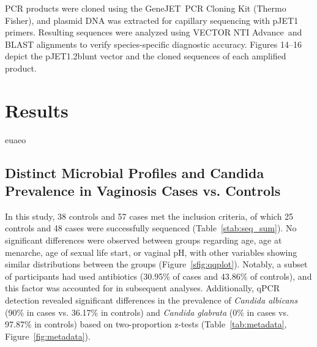 \documentclass[biotech,article,submit,pdftex,moreauthors]{Definitions/mdpi}
\begin{document}
PCR products were cloned using the GeneJET\texttrademark~PCR Cloning Kit (Thermo Fisher), and plasmid DNA was extracted for capillary sequencing with pJET1 primers. Resulting sequences were analyzed using VECTOR NTI Advance\texttrademark~and BLAST alignments to verify species-specific diagnostic accuracy. Figures 14--16 depict the pJET1.2blunt vector and the cloned sequences of each amplified product.




\section{Results}
euaeo

\subsection{Distinct Microbial Profiles and Candida Prevalence in Vaginosis Cases vs. Controls}

In this study, 38 controls and 57 cases met the inclusion criteria, of which 25 controls and 48 cases were successfully sequenced (Table~\ref{stab:seq_sum}). No significant differences were observed between groups regarding age, age at menarche, age of sexual life start, or vaginal pH, with other variables showing similar distributions between the groups (Figure~\ref{sfig:qqplot}). Notably, a subset of participants had used antibiotics (30.95\% of cases and 43.86\% of controls), and this factor was accounted for in subsequent analyses. Additionally, qPCR detection revealed significant differences in the prevalence of \textit{Candida albicans} (90\% in cases vs. 36.17\% in controls) and \textit{Candida glabrata} (0\% in cases vs. 97.87\% in controls) based on two-proportion z-tests (Table~\ref{tab:metadata}, Figure~\ref{fig:metadata}).
\end{document}
